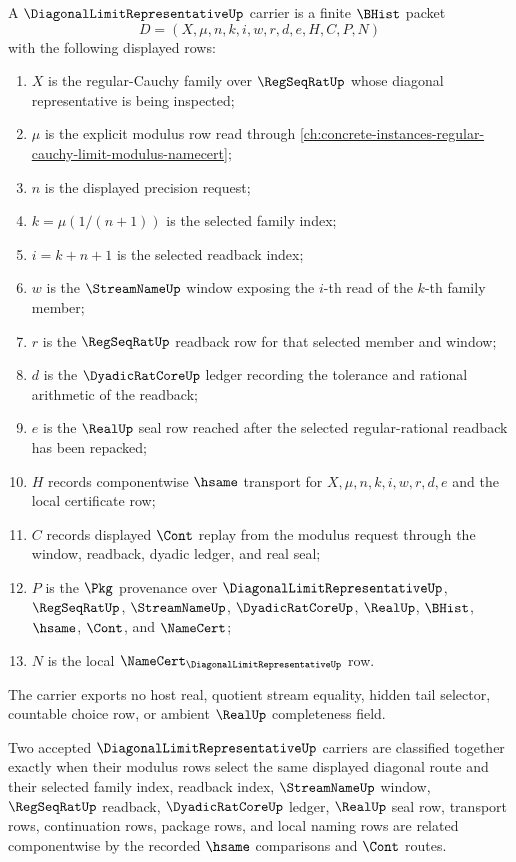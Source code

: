 \begin{definition}
\label{def:diagonal-limit-representative-carrier}
A $\DiagonalLimitRepresentativeUp$ carrier is a finite $\BHist$ packet
$$
D=(X,\mu,n,k,i,w,r,d,e,H,C,P,N)
$$
with the following displayed rows:
\begin{enumerate}
\item $X$ is the regular-Cauchy family over $\RegSeqRatUp$ whose diagonal representative is being inspected;
\item $\mu$ is the explicit modulus row read through \autoref{ch:concrete-instances-regular-cauchy-limit-modulus-namecert};
\item $n$ is the displayed precision request;
\item $k=\mu(1/(n+1))$ is the selected family index;
\item $i=k+n+1$ is the selected readback index;
\item $w$ is the $\StreamNameUp$ window exposing the $i$-th read of the $k$-th family member;
\item $r$ is the $\RegSeqRatUp$ readback row for that selected member and window;
\item $d$ is the $\DyadicRatCoreUp$ ledger recording the tolerance and rational arithmetic of the readback;
\item $e$ is the $\RealUp$ seal row reached after the selected regular-rational readback has been repacked;
\item $H$ records componentwise $\hsame$ transport for $X,\mu,n,k,i,w,r,d,e$ and the local certificate row;
\item $C$ records displayed $\Cont$ replay from the modulus request through the window, readback, dyadic ledger, and real seal;
\item $P$ is the $\Pkg$ provenance over $\DiagonalLimitRepresentativeUp$, $\RegSeqRatUp$, $\StreamNameUp$, $\DyadicRatCoreUp$, $\RealUp$, $\BHist$, $\hsame$, $\Cont$, and $\NameCert$;
\item $N$ is the local $\NameCert_{\DiagonalLimitRepresentativeUp}$ row.
\end{enumerate}
The carrier exports no host real, quotient stream equality, hidden tail selector, countable choice row, or ambient $\RealUp$ completeness field.
\end{definition}

\begin{definition}
\label{def:diagonal-limit-representative-classifier}
Two accepted $\DiagonalLimitRepresentativeUp$ carriers are classified together exactly when their modulus rows select the same displayed diagonal route and their selected family index, readback index, $\StreamNameUp$ window, $\RegSeqRatUp$ readback, $\DyadicRatCoreUp$ ledger, $\RealUp$ seal row, transport rows, continuation rows, package rows, and local naming rows are related componentwise by the recorded $\hsame$ comparisons and $\Cont$ routes.
\end{definition}

